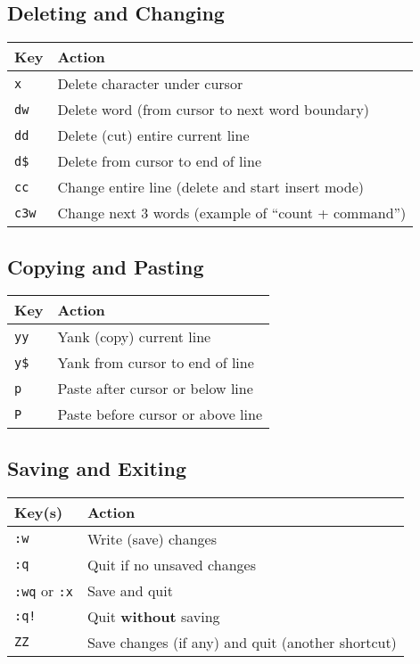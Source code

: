 \documentclass[a4paper]{report}
\begin{document}
\subsection*{Deleting and Changing}
\begin{table}[h!]
\begin{tabular}{|l|l|}
\hline
\textbf{Key} & \textbf{Action} \\
\hline
\texttt{x} & Delete character under cursor \\
\texttt{dw} & Delete word (from cursor to next word boundary) \\
\texttt{dd} & Delete (cut) entire current line \\
\texttt{d\$} & Delete from cursor to end of line \\
\texttt{cc} & Change entire line (delete and start insert mode) \\
\texttt{c3w} & Change next 3 words (example of “count + command”) \\
\hline
\end{tabular}
\end{table}

\subsection*{Copying and Pasting}
\begin{table}[h!]
\begin{tabular}{|l|l|}
\hline
\textbf{Key} & \textbf{Action} \\
\hline
\texttt{yy} & Yank (copy) current line \\
\texttt{y\$} & Yank from cursor to end of line \\
\texttt{p} & Paste after cursor or below line \\
\texttt{P} & Paste before cursor or above line \\
\hline
\end{tabular}
\end{table}

\newpage
\subsection*{Saving and Exiting}
\begin{table}[h!]
\begin{tabular}{|l|l|}
\hline
\textbf{Key(s)} & \textbf{Action} \\
\hline
\texttt{:w} & Write (save) changes \\
\texttt{:q} & Quit if no unsaved changes \\
\texttt{:wq} or \texttt{:x} & Save and quit \\
\texttt{:q!} & Quit \textbf{without} saving \\
\texttt{ZZ} & Save changes (if any) and quit (another shortcut) \\
\hline
\end{tabular}
\end{table}
\end{document}
